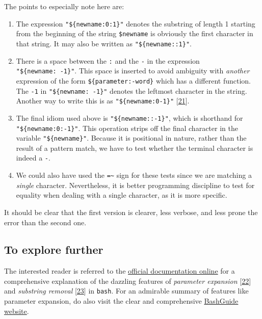 \documentclass[
  a4paper,
]{article}
\begin{document}
The points to especially note here are:

\begin{enumerate}
\def\labelenumi{(\alph{enumi})}
\item
  The expression \texttt{"\$\{newname:0:1\}"} denotes the substring of
  length 1 starting from the beginning of the string \texttt{\$newname}
  is obviously the first character in that string. It may also be
  written as \texttt{"\$\{newname::1\}"}.
\item
  There is a space between the \texttt{:} and the \texttt{-} in the
  expression \texttt{"\$\{newname:\ -1\}"}. This space is inserted to
  avoid ambiguity with \emph{another} expression of the form
  \texttt{\$\{parameter:-word\}} which has a different function. The
  \texttt{-1} in \texttt{"\$\{newname:\ -1\}"} denotes the leftmost
  character in the string. Another way to write this is as
  \texttt{"\$\{newname:0-1\}"}
  {[}\protect\hyperlink{ref-lastchar}{21}{]}.
\item
  The final idiom used above is \texttt{"\$\{newname::-1\}"}, which is
  shorthand for \texttt{"\$\{newname:0:-1\}"}. This operation strips off
  the final character in the variable \texttt{"\$\{newname\}"}. Because
  it is positional in nature, rather than the result of a pattern match,
  we have to test whether the terminal character is indeed a \texttt{-}.
\item
  We could also have used the \texttt{=\textasciitilde{}} sign for these
  tests since we are matching a \emph{single} character. Nevertheless,
  it is better programming discipline to test for equality when dealing
  with a single character, as it is more specific.
\end{enumerate}

It should be clear that the first version is clearer, less verbose, and
less prone the error than the second one.

\hypertarget{to-explore-further}{%
\subsection{To explore further}\label{to-explore-further}}

The interested reader is referred to the
\href{https://www.gnu.org/savannah-checkouts/gnu/bash/manual/bash.html\#Shell-Parameter-Expansion}{official
documentation online} for a comprehensive explanation of the dazzling
features of \emph{parameter expansion}
{[}\protect\hyperlink{ref-shellparamexp}{22}{]} and \emph{substring
removal} {[}\protect\hyperlink{ref-wikisubstring}{23}{]} in
\texttt{bash}. For an admirable summary of features like parameter
expansion, do also visit the clear and comprehensive
\href{https://mywiki.wooledge.org/BashGuide/Parameters}{BashGuide
website}.
\end{document}
